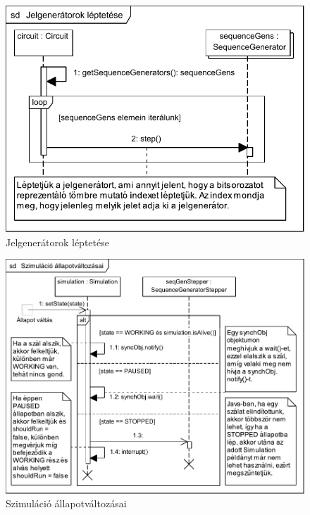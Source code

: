 \begin{figure}[H]
\begin{center}
\includegraphics{chapters/chapter03/seqdiagrams/sim_stepGenerators.pdf}
\caption{Jelgenerátorok léptetése}
\label{fig:sim_stepGenerators}
\end{center}
\end{figure}

\begin{figure}[H]
\begin{center}
\includegraphics{chapters/chapter03/seqdiagrams/sim_allapotvaltozasai.pdf}
\caption{Szimuláció állapotváltozásai}
\label{fig:sim_allapotvaltozasai}
\end{center}
\end{figure}

